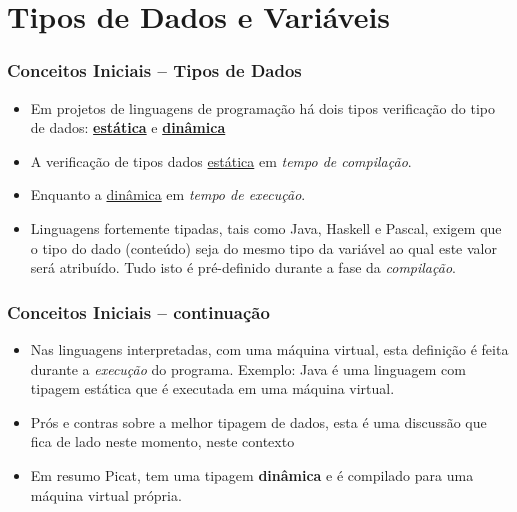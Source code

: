 
\section{Tipos de Dados e Variáveis}

\begin{frame}[fragile]
 \frametitle{Conceitos Iniciais -- Tipos de Dados}


\begin{itemize}

\item Em projetos de linguagens de programação há dois tipos 
verificação do tipo de dados: \underline{\textbf{estática}} e 
 \underline{\textbf{dinâmica}}

  
  \pause 
  \item A verificação de tipos dados   \underline{estática} 
   em \textit{tempo de compilação}.
  
    \pause 
  \item Enquanto a \underline{dinâmica} em \textit{tempo de execução}.
  
  \pause 
  \item Linguagens fortemente tipadas, tais como Java, Haskell e Pascal, 
  exigem que o tipo do dado (conteúdo) seja do mesmo tipo da variável 
  ao qual este valor será atribuído. 
  Tudo isto é pré-definido durante a fase da \textit{compilação}.
  
\end{itemize}
\end{frame}


\begin{frame}[fragile]

 \frametitle{Conceitos Iniciais -- continuação}
\begin{itemize}

  \item Nas linguagens interpretadas, com uma máquina virtual, 
  esta definição é feita durante a \textit{execução} do
  programa. Exemplo: Java é uma linguagem com tipagem estática que 
  é executada em uma máquina virtual.

  
  \pause 
  \item Prós e contras sobre a melhor tipagem de dados, esta é
  uma discussão que fica de lado neste momento, neste contexto
  
  \pause 
  \item Em resumo Picat, tem uma tipagem \textbf{dinâmica} e
   é compilado para uma   máquina virtual própria.
  
\end{itemize}
\end{frame}


